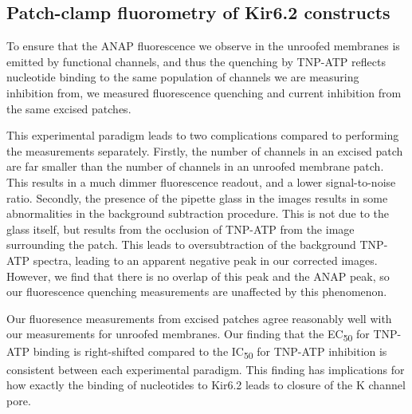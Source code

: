 \subsection{Patch-clamp fluorometry of Kir6.2 constructs}

To ensure that the ANAP fluorescence we observe in the unroofed membranes is emitted by functional channels, and thus the quenching by TNP-ATP reflects nucleotide binding to the same population of channels we are measuring inhibition from, we measured fluorescence quenching and current inhibition from the same excised patches.

This experimental paradigm leads to two complications compared to performing the measurements separately.
Firstly, the number of channels in an excised patch are far smaller than the number of channels in an unroofed membrane patch.
This results in a much dimmer fluorescence readout, and a lower signal-to-noise ratio.
Secondly, the presence of the pipette glass in the images results in some abnormalities in the background subtraction procedure.
This is not due to the glass itself, but results from the occlusion of TNP-ATP from the image surrounding the patch.
This leads to oversubtraction of the background TNP-ATP spectra, leading to an apparent negative peak in our corrected images.
However, we find that there is no overlap of this peak and the ANAP peak, so our fluorescence quenching measurements are unaffected by this phenomenon.

Our fluoresence measurements from excised patches agree reasonably well with our measurements for unroofed membranes.
Our finding that the EC\textsubscript{50} for TNP-ATP binding is right-shifted compared to the IC\textsubscript{50} for TNP-ATP inhibition is consistent between each experimental paradigm.
This finding has implications for how exactly the binding of nucleotides to Kir6.2 leads to closure of the K\ATP{} channel pore.

